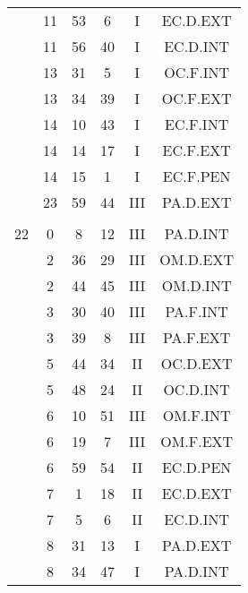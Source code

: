 \documentclass[12pt, a4paper]{article}
\begin{document}
\begin{multicols}{3}
{\begin{tabular}{c c c c c c}
	 	 	 	 & 11 & 53 & 6 & I & EC.D.EXT\\%
	 	 	 	 & 11 & 56 & 40 & I & EC.D.INT\\%
	 	 	 	 & 13 & 31 & 5 & I & OC.F.INT\\%
	 	 	 	 & 13 & 34 & 39 & I & OC.F.EXT\\%
	 	 	 	 & 14 & 10 & 43 & I & EC.F.INT\\%
	 	 	 	 & 14 & 14 & 17 & I & EC.F.EXT\\%
	 	 	 	 & 14 & 15 & 1 & I & EC.F.PEN\\%
	 	 	 	 & 23 & 59 & 44 & III & PA.D.EXT\\%
	 	 	 	 & & & & & \\%
	 	 	 	22 & 0 & 8 & 12 & III & PA.D.INT\\%
	 	 	 	 & 2 & 36 & 29 & III & OM.D.EXT\\%
	 	 	 	 & 2 & 44 & 45 & III & OM.D.INT\\%
	 	 	 	 & 3 & 30 & 40 & III & PA.F.INT\\%
	 	 	 	 & 3 & 39 & 8 & III & PA.F.EXT\\%
	 	 	 	 & 5 & 44 & 34 & II & OC.D.EXT\\%
	 	 	 	 & 5 & 48 & 24 & II & OC.D.INT\\%
	 	 	 	 & 6 & 10 & 51 & III & OM.F.INT\\%
	 	 	 	 & 6 & 19 & 7 & III & OM.F.EXT\\%
	 	 	 	 & 6 & 59 & 54 & II & EC.D.PEN\\%
	 	 	 	 & 7 & 1 & 18 & II & EC.D.EXT\\%
	 	 	 	 & 7 & 5 & 6 & II & EC.D.INT\\%
	 	 	 	 & 8 & 31 & 13 & I & PA.D.EXT\\%
	 	 	 	 & 8 & 34 & 47 & I & PA.D.INT\\%

\end{tabular}}
\end{multicols}
\end{document}
